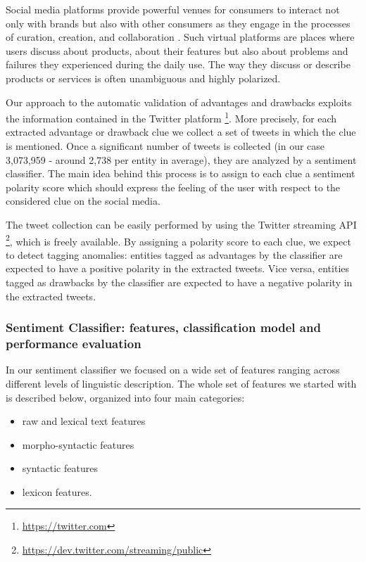 \documentclass[]{book}
\providecommand{\tightlist}{%
  \setlength{\itemsep}{0pt}\setlength{\parskip}{0pt}}
\let\rmarkdownfootnote\footnote%
\def\footnote{\protect\rmarkdownfootnote}
\begin{document}
Social media platforms provide powerful venues for consumers to interact
not only with brands but also with other consumers as they engage in the
processes of curation, creation, and collaboration
\citep{evans2010social}. Such virtual platforms are places where users
discuss about products, about their features but also about problems and
failures they experienced during the daily use. The way they discuss or
describe products or services is often unambiguous and highly polarized.

Our approach to the automatic validation of advantages and drawbacks
exploits the information contained in the Twitter platform \footnote{\url{https://twitter.com}}.
More precisely, for each extracted advantage or drawback clue we collect
a set of tweets in which the clue is mentioned. Once a significant
number of tweets is collected (in our case 3,073,959 - around 2,738 per
entity in average), they are analyzed by a sentiment classifier. The
main idea behind this process is to assign to each clue a sentiment
polarity score which should express the feeling of the user with respect
to the considered clue on the social media.

The tweet collection can be easily performed by using the Twitter
streaming API \footnote{\url{https://dev.twitter.com/streaming/public}},
which is freely available. By assigning a polarity score to each clue,
we expect to detect tagging anomalies: entities tagged as advantages by
the classifier are expected to have a positive polarity in the extracted
tweets. Vice versa, entities tagged as drawbacks by the classifier are
expected to have a negative polarity in the extracted tweets.

\subsubsection*{Sentiment Classifier: features, classification model and
performance
evaluation}\label{sentiment-classifier-features-classification-model-and-performance-evaluation}

In our sentiment classifier we focused on a wide set of features ranging
across different levels of linguistic description. The whole set of
features we started with is described below, organized into four main
categories:

\begin{itemize}
\tightlist
\item
  raw and lexical text features
\item
  morpho-syntactic features
\item
  syntactic features
\item
  lexicon features.
\end{itemize}
\end{document}
